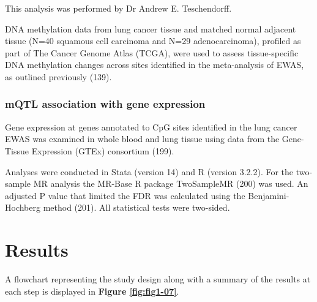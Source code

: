 \documentclass[11pt,oneside]{bristolthesis}
\begin{document}
This analysis was performed by Dr Andrew E. Teschendorff.

DNA methylation data from lung cancer tissue and matched normal adjacent tissue (N=40 squamous cell carcinoma and N=29 adenocarcinoma), profiled as part of The Cancer Genome Atlas (TCGA), were used to assess tissue-specific DNA methylation changes across sites identified in the meta-analysis of EWAS, as outlined previously (139).

\hypertarget{mqtl-association-with-gene-expression}{%
\subsubsection{mQTL association with gene expression}\label{mqtl-association-with-gene-expression}}

Gene expression at genes annotated to CpG sites identified in the lung cancer EWAS was examined in whole blood and lung tissue using data from the Gene-Tissue Expression (GTEx) consortium (199).

Analyses were conducted in Stata (version 14) and R (version 3.2.2). For the two-sample MR analysis the MR-Base R package TwoSampleMR (200) was used. An adjusted P value that limited the FDR was calculated using the Benjamini-Hochberg method (201). All statistical tests were two-sided.

\hypertarget{results-07}{%
\section{Results}\label{results-07}}

A flowchart representing the study design along with a summary of the results at each step is displayed in \textbf{Figure \ref{fig:fig1-07}}.
\end{document}
